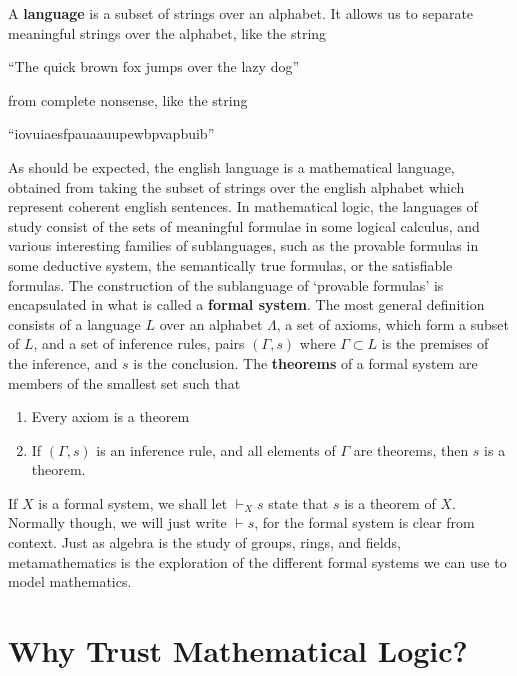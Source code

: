 A {\bf language} is a subset of strings over an alphabet. It allows us to separate meaningful strings over the alphabet, like the string
%
\begin{center}
    ``The quick brown fox jumps over the lazy dog''
\end{center}
%
from complete nonsense, like the string
%
\begin{center}
    ``iovuiaesfpauaauupewbpvapbuib''
\end{center}
%
As should be expected, the english language is a mathematical language, obtained from taking the subset of strings over the english alphabet which represent coherent english sentences. In mathematical logic, the languages of study consist of the sets of meaningful formulae in some logical calculus, and various interesting families of sublanguages, such as the provable formulas in some deductive system, the semantically true formulas, or the satisfiable formulas. The construction of the sublanguage of `provable formulas' is encapsulated in what is called a {\bf formal system}. The most general definition consists of a language $L$ over an alphabet $\Lambda$, a set of axioms, which form a subset of $L$, and a set of inference rules, pairs $(\Gamma, s)$ where $\Gamma \subset L$ is the premises of the inference, and $s$ is the conclusion. The {\bf theorems} of a formal system are members of the smallest set such that
%
\begin{enumerate}
    \item Every axiom is a theorem
    \item If $(\Gamma, s)$ is an inference rule, and all elements of $\Gamma$ are theorems, then $s$ is a theorem.
\end{enumerate}
%
If $X$ is a formal system, we shall let $\vdash_X s$ state that $s$ is a theorem of $X$. Normally though, we will just write $\vdash s$, for the formal system is clear from context. Just as algebra is the study of groups, rings, and fields, metamathematics is the exploration of the different formal systems we can use to model mathematics.

\section{Why Trust Mathematical Logic?}

